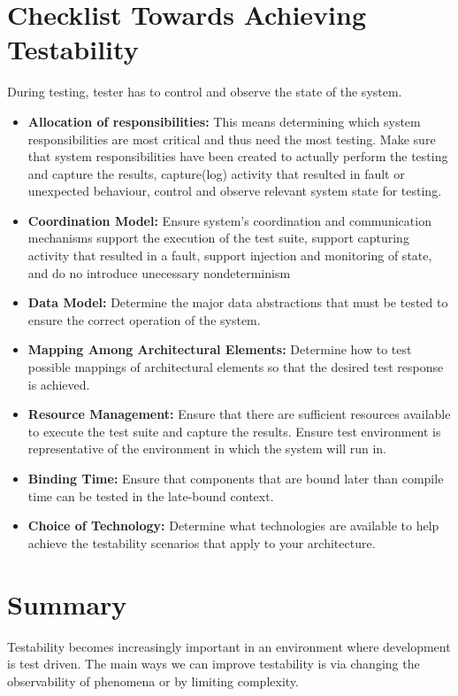 \documentclass[a4paper]{report}
\begin{document}
\section{Checklist Towards Achieving Testability}
During testing, tester has to control and observe the state of the system.

\begin{itemize}
\item
\textbf{Allocation of responsibilities:}
This means determining which system responsibilities are most critical and thus need the most testing.
Make sure that system responsibilities have been created to actually perform the testing and capture the results, capture(log) activity that resulted in fault or unexpected behaviour, control and observe relevant system state for testing.

\item
\textbf{Coordination Model:}
Ensure system's coordination and communication mechanisms
support the execution of the test suite,
support capturing activity that resulted in a fault,
support injection and monitoring of state, and
do no introduce unecessary nondeterminism

\item
\textbf{Data Model:}
Determine the major data abstractions that must be tested to ensure the correct operation of the system.

\item
\textbf{Mapping Among Architectural Elements:}
Determine how to test possible mappings of architectural elements so that the desired test response is achieved.

\item
\textbf{Resource Management:}
Ensure that there are sufficient resources available to execute the test suite and capture the results. 
Ensure test environment is representative of the environment in which the system will run in.

\item
\textbf{Binding Time:}
Ensure that components that are bound later than compile time can be tested in the late-bound context.

\item
\textbf{Choice of Technology:}
Determine what technologies are available to help achieve the testability scenarios that apply to your architecture. 
\end{itemize}

\section{Summary}
Testability becomes increasingly important in an environment where development is test driven. The main ways we can improve testability is via changing the observability of phenomena or by limiting complexity.
\end{document}
